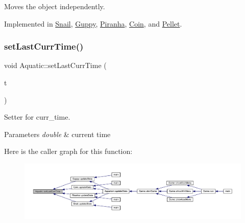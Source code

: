 Moves the object independently. 



Implemented in \mbox{\hyperlink{class_snail_af5892ec122d9199480c813b74488256b}{Snail}}, \mbox{\hyperlink{class_guppy_ae6002948d74b3741bed34a7311be4377}{Guppy}}, \mbox{\hyperlink{class_piranha_a6b86e73b3e5a57ee0fdb768c24ab9b67}{Piranha}}, \mbox{\hyperlink{class_coin_ab62bca5834489b9b483deaa3ca3470e9}{Coin}}, and \mbox{\hyperlink{class_pellet_a7385101b04083be663ae465c38fd2a4d}{Pellet}}.

\mbox{\label{class_aquatic_ae2fa11b1ff4a3763a7a7bd4924f6c1eb}} 
\subsubsection{\texorpdfstring{set\+Last\+Curr\+Time()}{setLastCurrTime()}}
{\footnotesize\ttfamily void Aquatic\+::set\+Last\+Curr\+Time (\begin{DoxyParamCaption}\item[{double}]{t }\end{DoxyParamCaption})}



Setter for curr\+\_\+time. 


\begin{DoxyParams}{Parameters}
{\em double} & current time \\
\hline
\end{DoxyParams}
Here is the caller graph for this function\+:
\nopagebreak
\begin{figure}[H]
\begin{center}
\leavevmode
\includegraphics[width=350pt]{class_aquatic_ae2fa11b1ff4a3763a7a7bd4924f6c1eb_icgraph}
\end{center}
\end{figure}
\mbox{\label{class_aquatic_a50e51e4b7bfd7f46d3c43bde27e0a5d8}} 
